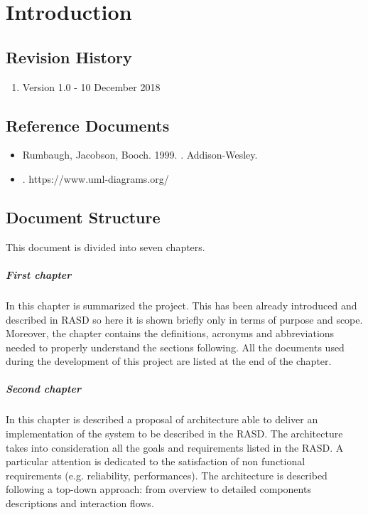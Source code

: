 \documentclass[../DD.tex]{subfiles}
\begin{document}
\chapter{Introduction}
\thispagestyle{fancy}
		
		
		
		
		
		\section{Revision History}
		\begin{enumerate}
			\item Version 1.0 - 10 December 2018
		\end{enumerate}
		
		\section{Reference Documents}
			\begin{itemize}
				\item Rumbaugh, Jacobson, Booch. 1999. . Addison-Wesley.
				\item {}. https://www.uml-diagrams.org/
			\end{itemize}
			
		\section{Document Structure}
		This document is divided into seven chapters.
		
		\paragraph{First chapter}
		In this chapter is summarized the project. This has been already introduced and described in RASD so here it is shown briefly only in terms of purpose and scope. Moreover, the chapter contains the definitions, acronyms and abbreviations needed to properly understand the sections following. All the documents used during the development of this project are listed at the end of the chapter.
		\paragraph{Second chapter}
			In this chapter is described a proposal of architecture able to deliver an implementation of the system to be described in the RASD. The architecture takes into consideration all the goals and requirements listed in the RASD. A particular attention is dedicated to the satisfaction of non functional requirements (e.g. reliability, performances). The architecture is described following a top-down approach: from overview to detailed components descriptions and interaction flows.
\end{document}
